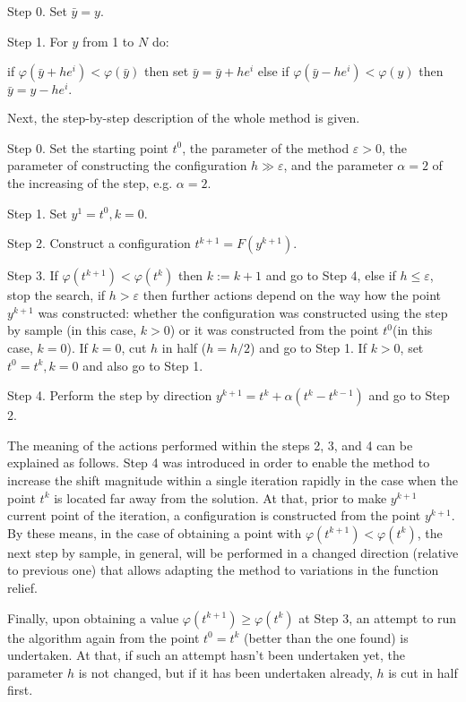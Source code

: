 \documentclass[runningheads]{llncs}
\begin{document}
Step 0. Set $\bar{y} = y$.

Step 1. For $y$ from 1 to $N$ do:

if $\varphi(\bar{y} + he^i) < \varphi(\bar{y})$ then set $\bar{y} = \bar{y} + he^i$ else if $\varphi(\bar{y} - he^i) < \varphi(y)$ then $\bar{y} = y - he^i.$

Next, the step-by-step description of the whole method is given.

Step 0. Set the starting point $t^0$, the parameter of the method $\varepsilon > 0$, the parameter of constructing the configuration $h\gg\varepsilon$, and the parameter $\alpha=2$ of the increasing of the step, e.g. $\alpha=2$.

Step 1. Set $y^1  = t^0, k = 0$.

Step 2. Construct a configuration $t^{k+1} = F(y^{k +1})$.

Step 3. If $\varphi(t^{k+1}) < \varphi(t^{k})$ then $k:=k+1$ and go to Step 4, else if $h \leq \varepsilon$, stop the search, if $h > \varepsilon$ then further actions depend on the  way how the point $y^{k+1}$ was constructed: whether the configuration was constructed using the step by sample (in this case, $k > 0$) or it was constructed from the point $t^0$(in this case, $k=0$). If $k=0$, cut $h$ in half ($h=h/2$) and go to Step 1. If $k>0$, set $t^0 = t^k, k=0$ and also go to Step 1.

Step 4. Perform the step by direction $y^{k+1} = t^k + \alpha (t^k - t^{k-1})$ and go to Step 2.

The meaning of the actions performed within the steps 2, 3, and 4 can be explained as follows. 
Step 4 was introduced in order to enable the method to increase the shift magnitude within a single iteration rapidly in the case when the point $t^k$ is located far away from the solution. At that, prior to make $y^{k+1}$ current point of the iteration, a configuration is constructed from the point $y^{k+1}$. By these means, in the case of obtaining a point with $\varphi(t^{k+1})< \varphi(t^k)$, the next step by sample, in general, will be performed in a changed direction (relative to previous one) that allows adapting the method to variations in the function relief.

Finally, upon obtaining a value $\varphi(t^{k+1}) \geq \varphi(t^k)$ at Step 3, an attempt to run the algorithm again from the point $t^0=t^k$ (better than the one found) is undertaken. At that, if such an attempt hasn’t been undertaken yet, the parameter $h$ is not changed, but if it has been undertaken already, $h$ is cut in half first.
\end{document}

